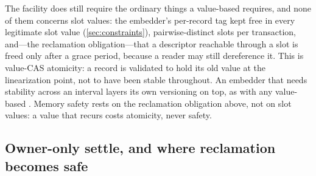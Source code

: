 \documentclass[11pt]{article}
\begin{document}
The facility does still require the ordinary things a value-based \mcas requires,
and none of them concerns slot values: the embedder's per-record tag kept free
in every legitimate slot value (\cref{sec:constraints}), pairwise-distinct slots
per transaction, and---the reclamation obligation---that a descriptor
reachable through a slot is freed only after a grace period, because a reader may
still dereference it. This is value-CAS atomicity: a record is validated to hold
its old value at the linearization point, not to have been stable throughout. An
embedder that needs stability across an interval layers its own versioning on
top, as with any value-based \mcas. Memory safety rests on the reclamation
obligation above, not on slot values: a value that recurs costs atomicity, never
safety.

%
%
%

\subsection{Owner-only settle, and where reclamation becomes safe}
\label{sec:settle}
\end{document}
